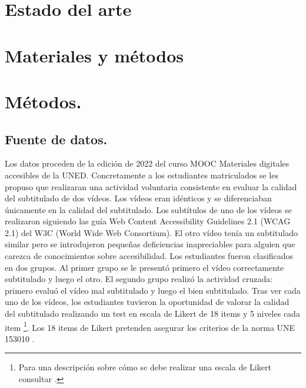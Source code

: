 \documentclass[
  12pt,
  a4paper,
  extrafontsizes,
  onecolumn,
  openright]{memoir}
\begin{document}

\hypertarget{estado-del-arte}{%
\chapter{Estado del arte}\label{estado-del-arte}}


\hypertarget{materiales}{%
\chapter{Materiales y métodos}\label{materiales}}


\hypertarget{muxe9todos.}{%
\chapter{Métodos.}\label{muxe9todos.}}

\hypertarget{fuente-de-datos.}{%
\section{Fuente de datos.}\label{fuente-de-datos.}}

Los datos proceden de la edición de 2022 del curso MOOC Materiales
digitales accesibles de la UNED. Concretamente a los estudiantes
matriculados se les propuso que realizaran una actividad voluntaria
consistente en evaluar la calidad del subtitulado de dos vídeos. Los
vídeos eran idénticos y se diferenciaban únicamente en la calidad del
subtitulado. Los subtítulos de uno de los vídeos se realizaron
\autocites[ver][]{jperez1,jperez2} siguiendo las guía Web Content
Accessibility Guidelines 2.1 (WCAG 2.1) del W3C (World Wide Web
Consortium). El otro vídeo tenía un subtitulado similar pero se
introdujeron pequeñas deficiencias inapreciables para alguien que
carezca de conocimientos sobre accesibilidad. Los estudiantes fueron
clasificados en dos grupos. Al primer grupo se le presentó primero el
vídeo correctamente subtitulado y luego el otro. El segundo grupo
realizó la actividad cruzada: primero evaluó el vídeo mal subtitulado y
luego el bien subtitulado. Tras ver cada uno de los vídeos, los
estudiantes tuvieron la oportunidad de valorar la calidad del
subtitulado realizando un test en escala de Likert de 18 items y 5
niveles cada item \footnote{Para una descripción sobre cómo se debe
  realizar una escala de Likert consultar \textcite{likert1}.}. Los 18
items de Likert pretenden asegurar los criterios de la norma UNE 153010
\autocite[ver][]{aenor2012}.
\end{document}
